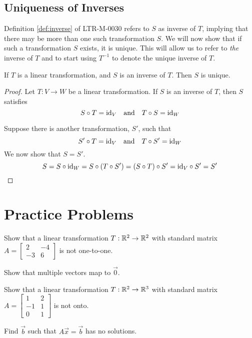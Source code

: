 \documentclass{ximera}
\begin{document}
\subsection*{Uniqueness of Inverses}

Definition \ref{def:inverse} of LTR-M-0030 refers to $S$ as  inverse of $T$, implying that there may be more than one such transformation $S$.  We will now show that if such a transformation $S$ exists, it is unique.  This will allow us to refer to {\it the} inverse of $T$ and to start using $T^{-1}$ to denote the unique inverse of $T$.

\begin{theorem}\label{th:inverseisunique}
If $T$ is a linear transformation, and $S$ is an inverse of $T$.  Then $S$ is unique.
\end{theorem}
\begin{proof}
Let $T:V\rightarrow W$ be a linear transformation.  If $S$ is an inverse of $T$, then $S$ satisfies
$$S\circ T=\text{id}_V\quad \text{and}\quad T\circ S=\text{id}_W$$

Suppose there is another transformation, $S'$, such that 
$$S'\circ T=\text{id}_V\quad \text{and}\quad T\circ S'=\text{id}_W$$
We now show that $S=S'$.
$$S=S\circ \text{id}_W=S\circ(T\circ S')=(S\circ T)\circ S'=\text{id}_V\circ S'=S'$$
\end{proof}

\section*{Practice Problems}
\begin{problem}
Show that a linear transformation $T:\mathbb{R}^2\rightarrow \mathbb{R}^2$ with standard matrix $A=\begin{bmatrix}2&-4\\-3&6\end{bmatrix}$ is not one-to-one.
\begin{hint}
        Show that multiple vectors map to $\vec{0}$.
      \end{hint}
\end{problem}
 
 \begin{problem}
 Show that a linear transformation $T:\mathbb{R}^2\rightarrow \mathbb{R}^3$ with standard matrix $A=\begin{bmatrix}1&2\\-1&1\\0&1\end{bmatrix}$ is not onto.
 \begin{hint}
 Find $\vec{b}$ such that $A\vec{x}=\vec{b}$ has no solutions.
 \end{hint}
 \end{problem}
 
\end{document}
